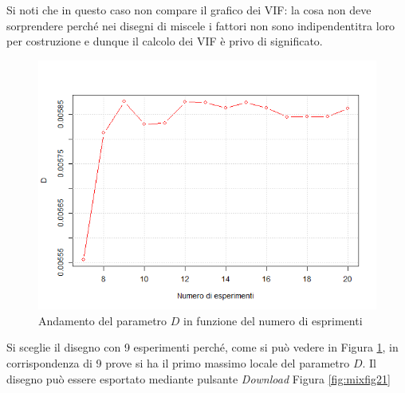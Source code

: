\documentclass[
  11pt,
]{book}
\begin{document}
Si noti che in questo caso non compare il grafico dei VIF: la cosa non deve sorprendere perché nei disegni di miscele i fattori non sono indipendentitra loro per costruzione e dunque il calcolo dei VIF è privo di significato.

\begin{figure}[ht]

{\centering \includegraphics[width=1\linewidth]{Immagini/Mixt/20_grafD} 

}

\caption{Andamento del parametro $D$ in funzione del numero di esprimenti}\label{fig:mixfig20}
\end{figure}

Si sceglie il disegno con 9 esperimenti perché, come si può vedere in Figura \ref{fig:mixfig20}, in corrispondenza di 9 prove si ha il primo massimo locale del parametro \(D\). Il disegno può essere esportato mediante pulsante \emph{Download} Figura \ref{fig:mixfig21}
\end{document}
